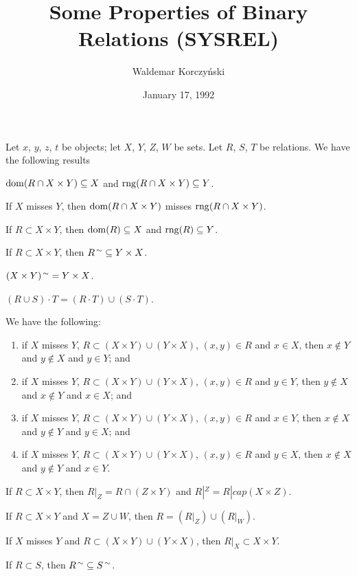 \documentclass{article}
\title{Some Properties of Binary Relations (SYSREL)}
\author{Waldemar Korczy\'nski}
\date{January 17, 1992}
\begin{document}
\maketitle

Let $x$, $y$, $z$, $t$ be objects; let $X$, $Y$, $Z$, $W$ be sets. Let
$R$, $S$, $T$ be relations. We have the following results
\begin{thm}
\item\label{sysrel:1} $\operatorname{dom}(R\cap X\times Y)\subseteq X$ and $\operatorname{rng}(R\cap X\times Y)\subseteq Y$.
\item\label{sysrel:2} If $X$ misses $Y$,
  then $\operatorname{dom}(R\cap X\times Y)$ misses $\operatorname{rng}(R\cap X\times Y)$.
\item\label{sysrel:3} If $R\subset X\times Y$,
  then $\operatorname{dom}(R)\subseteq X$ and $\operatorname{rng}(R)\subseteq Y$.
\item\label{sysrel:4} If $R\subset X\times Y$, then $R^{\,\sim}\subseteq Y\times X$.
\item\label{sysrel:5} $(X\times Y)^{\,\sim}=Y\times X$.
\item\label{sysrel:6} $(R\cup S)\cdot T=(R\cdot T)\cup(S\cdot T)$.
\item\label{sysrel:7} We have the following:
  \begin{enumerate}[label=(\alph*)]
  \item if $X$ misses $Y$, $R\subset (X\times Y)\cup(Y\times X)$,
    $(x,y)\in R$ and $x\in X$, then $x\notin Y$ and $y\notin X$ and
    $y\in Y$; and
  \item if $X$ misses $Y$, $R\subset (X\times Y)\cup(Y\times X)$,
    $(x,y)\in R$ and $y\in Y$, then $y\notin X$ and $x\notin Y$ and
    $x\in X$; and
  \item if $X$ misses $Y$, $R\subset (X\times Y)\cup(Y\times X)$,
    $(x,y)\in R$ and $x\in Y$, then $x\notin X$ and $y\notin Y$ and
    $y\in X$; and
  \item if $X$ misses $Y$, $R\subset (X\times Y)\cup(Y\times X)$,
    $(x,y)\in R$ and $y\in X$, then $x\notin X$ and $y\notin Y$ and
    $x\in Y$.
  \end{enumerate}
\item\label{sysrel:8} If $R\subset X\times Y$, then
  $R|_{Z}=R\cap(Z\times Y)$ and $R|^{Z}=R|cap(X\times Z)$.
\item\label{sysrel:9} If $R\subset X\times Y$ and $X=Z\cup W$,
  then $R=(R|_{Z})\cup(R|_{W})$.
\item\label{sysrel:10} If $X$ misses $Y$ and $R\subset(X\times Y)\cup(Y\times X)$,
  then $R|_{X}\subset X\times Y$.
\item\label{sysrel:11} If $R\subset S$, then $R^{\,\sim}\subseteq S^{\,\sim}$.

\end{thm}
\end{document}
